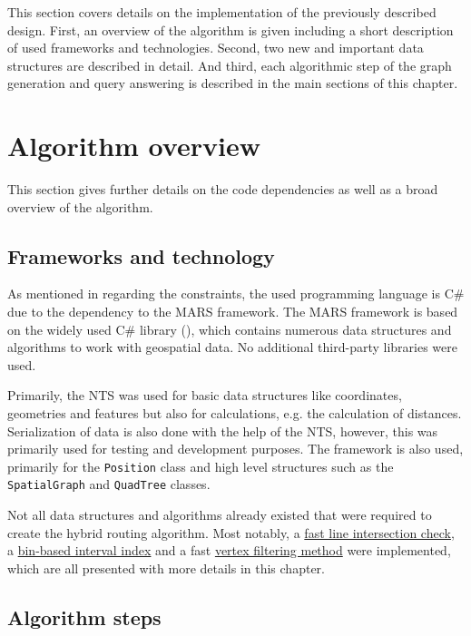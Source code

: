 
This section covers details on the implementation of the previously described design.
First, an overview of the algorithm is given including a short description of used frameworks and technologies.
Second, two new and important data structures are described in detail.
And third, each algorithmic step of the graph generation and query answering is described in the main sections of this chapter.

\section{Algorithm overview}

	This section gives further details on the code dependencies as well as a broad overview of the algorithm.

	\subsection{Frameworks and technology}
	\label{subsec:frameworks-technology}
	
		As mentioned in  regarding the constraints, the used programming language is C\# due to the dependency to the MARS framework.
		The MARS framework is based on the widely used C\# library  (), which contains numerous data structures and algorithms to work with geospatial data.
		No additional third-party libraries were used.
		
		Primarily, the NTS was used for basic data structures like coordinates, geometries and features but also for calculations, e.g. the calculation of distances.
		Serialization of data is also done with the help of the NTS, however, this was primarily used for testing and development purposes.
		The  framework is also used, primarily for the \texttt{Position} class and high level structures such as the \texttt{SpatialGraph} and \texttt{QuadTree} classes.
		
		Not all data structures and algorithms already existed that were required to create the hybrid routing algorithm.
		Most notably, a \hyperref[subsubsec:intersection-checks]{fast line intersection check}, a \hyperref[subsec:binindex]{bin-based interval index} and a fast \hyperref[subsec:shadow-areas]{vertex filtering method} were implemented, which are all presented with more details in this chapter.
			
	\subsection{Algorithm steps}
	\label{subsec:algorithm-steps}
	
